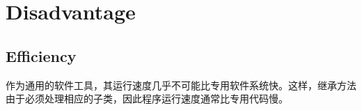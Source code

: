 \chapter{Disadvantage}

\section{Efficiency}

作为通用的软件工具，其运行速度几乎不可能比专用软件系统快。这样，继承方法由于必须处理相应的子类，因此程序运行速度通常比专用代码慢。



\begin{lstlisting}[language=C++]

\end{lstlisting}





\begin{lstlisting}[language=C++]

\end{lstlisting}





\begin{lstlisting}[language=C++]

\end{lstlisting}




\begin{lstlisting}[language=C++]

\end{lstlisting}





\begin{lstlisting}[language=C++]

\end{lstlisting}





\begin{lstlisting}[language=C++]

\end{lstlisting}





\begin{lstlisting}[language=C++]

\end{lstlisting}





